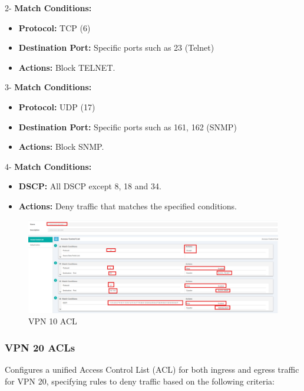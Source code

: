 \documentclass[12pt,english]{report}
\begin{document}
2- \textbf{Match Conditions:}
      
\begin{itemize}
    \item \textbf{Protocol:} TCP (6)
    \item \textbf{Destination Port:} Specific ports such as 23 (Telnet)
    \item \textbf{Actions:} Block TELNET.
\end{itemize}
    
3- \textbf{Match Conditions:}
           
\begin{itemize}
    \item \textbf{Protocol:} UDP (17)
    \item \textbf{Destination Port:} Specific ports such as 161, 162 (SNMP)
    \item \textbf{Actions:} Block SNMP.
\end{itemize}
    
4- \textbf{Match Conditions:}
        
\begin{itemize}
    \item \textbf{DSCP:} All DSCP except 8, 18 and 34.
    \item \textbf{Actions:} Deny traffic that matches the specified conditions.
\end{itemize}

\begin{figure}[H]
    \centering
    \includegraphics[width=1.1\textwidth]{chapitre 3/vpn10_ACL_DCSE.png}
    \caption{VPN 10 ACL}
    \label{VPN 10 Unified ACL}
\end{figure}

\subsubsection{VPN 20 ACLs}
Configures a unified Access Control List (ACL) for both ingress and egress traffic for VPN 20, specifying rules to deny traffic based on the following criteria:
 
\end{document}

